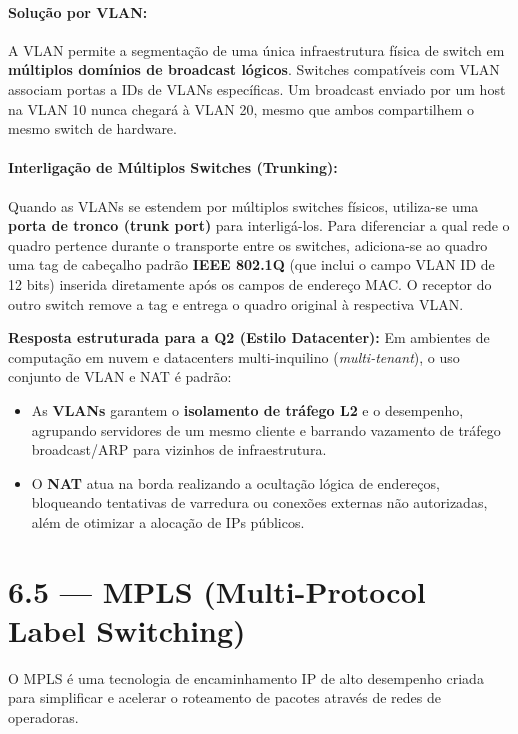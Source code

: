 \documentclass[11pt,a4paper]{article}
\begin{document}
\paragraph{Solução por VLAN:}
A VLAN permite a segmentação de uma única infraestrutura física de switch em \textbf{múltiplos domínios de broadcast lógicos}. Switches compatíveis com VLAN associam portas a IDs de VLANs específicas. Um broadcast enviado por um host na VLAN 10 nunca chegará à VLAN 20, mesmo que ambos compartilhem o mesmo switch de hardware.

\paragraph{Interligação de Múltiplos Switches (Trunking):}
Quando as VLANs se estendem por múltiplos switches físicos, utiliza-se uma \textbf{porta de tronco (trunk port)} para interligá-los. Para diferenciar a qual rede o quadro pertence durante o transporte entre os switches, adiciona-se ao quadro uma tag de cabeçalho padrão \textbf{IEEE 802.1Q} (que inclui o campo VLAN ID de 12 bits) inserida diretamente após os campos de endereço MAC. O receptor do outro switch remove a tag e entrega o quadro original à respectiva VLAN.

\begin{nota}
\textbf{Resposta estruturada para a Q2 (Estilo Datacenter):}
Em ambientes de computação em nuvem e datacenters multi-inquilino (\emph{multi-tenant}), o uso conjunto de VLAN e NAT é padrão:
\begin{itemize}
    \item As \textbf{VLANs} garantem o \textbf{isolamento de tráfego L2} e o desempenho, agrupando servidores de um mesmo cliente e barrando vazamento de tráfego broadcast/ARP para vizinhos de infraestrutura.
    \item O \textbf{NAT} atua na borda realizando a ocultação lógica de endereços, bloqueando tentativas de varredura ou conexões externas não autorizadas, além de otimizar a alocação de IPs públicos.
\end{itemize}
\end{nota}

\hrulefill

\section{6.5 --- MPLS (Multi-Protocol Label Switching)}

O MPLS é uma tecnologia de encaminhamento IP de alto desempenho criada para simplificar e acelerar o roteamento de pacotes através de redes de operadoras.
\end{document}
